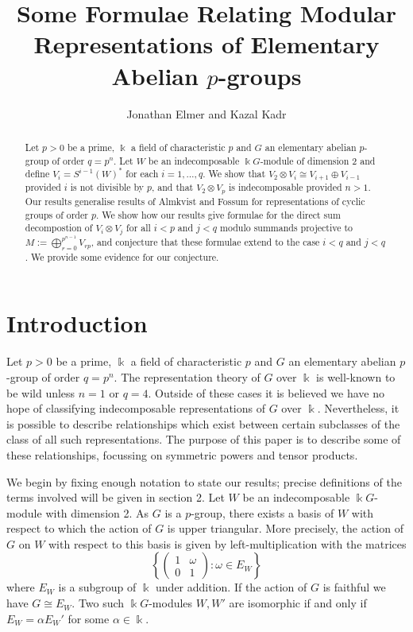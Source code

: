\documentclass[a4paper]{amsart}
\title{Some Formulae Relating Modular Representations of Elementary Abelian $p$-groups}
\author{Jonathan Elmer and Kazal Kadr}
\newcommand{\kk}{\Bbbk}
\theoremstyle{definition}
\theoremstyle{remark}
\theoremstyle{Acknowledgments}
\begin{document}
\maketitle

\begin{abstract}
 Let $p>0$ be a prime, $\kk$ a field of characteristic $p$ and $G$ an elementary abelian $p$-group of order $q=p^n$. Let $W$ be an indecomposable $\kk G$-module of dimension 2 and define $V_i = S^{i-1}(W)^*$ for each $i=1, \ldots, q$. We show that $V_2 \otimes V_i \cong V_{i+1} \oplus V_{i-1}$ provided $i$ is not divisible by $p$, and that $V_2 \otimes V_p$ is indecomposable provided $n>1$. Our results generalise results of Almkvist and Fossum \cite{AlmkvistFossum} for representations of cyclic groups of order $p$. We show how our results give formulae for the direct sum decompostion of $V_i \otimes V_j$ for all $i<p$ and $j<q$ modulo summands projective to $M:= \bigoplus_{r=0}^{p^{n-1}}V_{rp}$, and conjecture that these formulae extend to the case $i<q$ and $j<q$. We provide some evidence for our conjecture. 
\end{abstract}

\section{Introduction} Let $p>0$ be a prime, $\kk$ a field of characteristic $p$ and $G$ an elementary abelian $p$-group of order $q=p^n$. The representation theory of $G$ over $\kk$ is well-known to be wild unless $n=1$ or $q=4$. Outside of these cases it is believed we have no hope of classifying indecomposable representations of $G$ over $\kk$. Nevertheless, it is possible to describe relationships which exist between certain subclasses of the class of all such representations. The purpose of this paper is to describe some of these relationships, focussing on symmetric powers and tensor products.

We begin by fixing enough notation to state our results; precise definitions of the terms involved will be given in section 2. Let $W$ be an indecomposable $\kk G$-module with dimension 2. As $G$ is a $p$-group, there exists a basis of $W$ with respect to which the action of $G$ is upper triangular. More precisely, the action of $G$ on $W$ with respect to this basis is given by left-multiplication with the matrices
\[\left\{\begin{pmatrix} 1 & \omega \\ 0 & 1 \end{pmatrix}: \omega \in E_W\right\}\] where $E_W$ is a subgroup of $\kk$ under addition. If the action of $G$ is faithful we have $G \cong E_W$. Two such $\kk G$-modules $W, W'$ are isomorphic if and only if $E_W = \alpha E_W'$ for some $\alpha \in \kk$.
\end{document}
